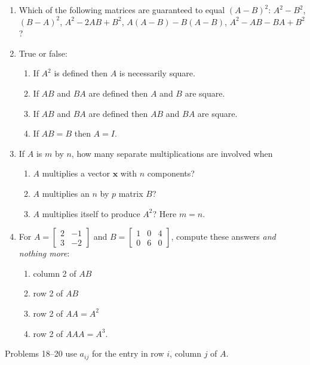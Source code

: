 \documentclass[14pt, a4paper]{article}
\begin{document}
\begin{enumerate}
    \item Which of the following matrices are guaranteed to equal $(A-B)^2$: \quad $A^2 - B^2$, \quad $(B-A)^2$, \quad $A^2 - 2AB + B^2$, \quad $A(A-B) - B(A-B)$, \quad $A^2 - AB - BA + B^2$?

    \item True or false:
          \begin{enumerate}
              \item If $A^2$ is defined then $A$ is necessarily square.
              \item If $AB$ and $BA$ are defined then $A$ and $B$ are square.
              \item If $AB$ and $BA$ are defined then $AB$ and $BA$ are square.
              \item If $AB = B$ then $A = I$.
          \end{enumerate}

    \item If $A$ is $m$ by $n$, how many separate multiplications are involved when
          \begin{enumerate}
              \item $A$ multiplies a vector $\boldsymbol{x}$ with $n$ components?
              \item $A$ multiplies an $n$ by $p$ matrix $B$?
              \item $A$ multiplies itself to produce $A^2$? Here $m = n$.
          \end{enumerate}

    \item For $A = \begin{bmatrix} 2 & -1 \\ 3 & -2 \end{bmatrix}$ and $B = \begin{bmatrix} 1 & 0 & 4 \\ 0 & 6 & 0 \end{bmatrix}$, compute these answers \textit{and nothing more}:
          \begin{enumerate}
              \item column 2 of $AB$
              \item row 2 of $AB$
              \item row 2 of $AA = A^2$
              \item row 2 of $AAA = A^3$.
          \end{enumerate}
\end{enumerate}

\noindent Problems 18--20 use $a_{ij}$ for the entry in row $i$, column $j$ of $A$.
\end{document}
